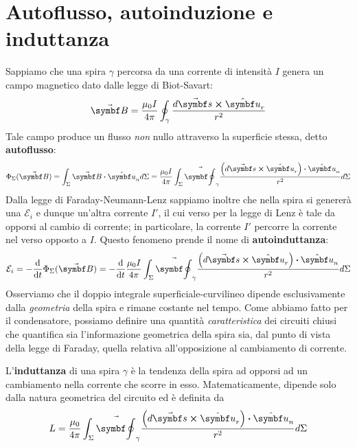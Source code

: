 \section{Autoflusso, autoinduzione e induttanza}
Sappiamo che una spira $\gamma$ percorsa da una corrente di intensità $I$ genera un campo magnetico dato dalle legge di Biot-Savart:
\begin{equation*}
	\vba{B}=\frac{\mu_0 I}{4\pi}\oint_{\gamma}\frac{d\vba{s}\cross\vbh{u}_{r}}{r^2}
\end{equation*}
Tale campo produce un flusso \textit{non} nullo attraverso la superficie stessa, detto \textbf{autoflusso}:
\begin{equation}
	\Phi_{\Sigma}(\vba{B})=\int_{\Sigma}\vba{B}\vdot\vbh{u}_nd\Sigma=\frac{\mu_0 I}{4\pi}\int_{\Sigma}\vba\oint_{\gamma}\frac{\left(d\vba{s}\cross\vbh{u}_{r}\right)\vdot \vbh{u}_n}{r^2}d\Sigma
\end{equation}
Dalla legge di Faraday-Neumann-Lenz sappiamo inoltre che nella spira si genererà una \fem $\mathcal{E}_i$ e dunque un'altra corrente $I'$, il cui verso per la legge di Lenz è tale da opporsi al cambio di corrente; in particolare, la corrente $I'$ percorre la corrente nel verso opposto a $I$. Questo fenomeno prende il nome di \textbf{autoinduttanza}:
\begin{equation*}
	\mathcal{E}_i=-\dv{t}\Phi_{\Sigma}(\vba{B})=-\dv{t}\frac{\mu_0 I}{4\pi}\int_{\Sigma}\vba\oint_{\gamma}\frac{\left(d\vba{s}\cross\vbh{u}_{r}\right)\vdot \vbh{u}_n}{r^2}d\Sigma
\end{equation*} %
Osserviamo che il doppio integrale superficiale-curvilineo dipende esclusivamente dalla \textit{geometria} della spira e rimane costante nel tempo. Come abbiamo fatto per il condensatore, possiamo definire una quantità \textit{caratteristica} dei circuiti chiusi che quantifica sia l'informazione geometrica della spira sia, dal punto di vista della legge di Faraday, quella relativa all'opposizione al cambiamento di corrente. 
\begin{define}[Induttanza]
	L'\textbf{induttanza} di una spira $\gamma$ è la tendenza della spira ad opporsi ad un cambiamento nella corrente che scorre in esso. Matematicamente, dipende solo dalla natura geometrica del circuito ed è definita da
	\begin{equation}
		L=\frac{\mu_0}{4\pi}\int_{\Sigma}\vba\oint_{\gamma}\frac{\left(d\vba{s}\cross\vbh{u}_{r}\right)\vdot \vbh{u}_n}{r^2}d\Sigma
	\end{equation}
\end{define}
